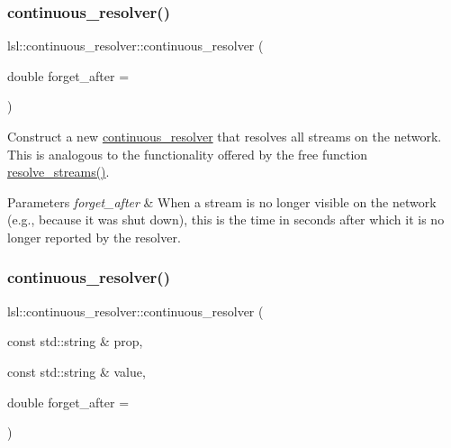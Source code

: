 \subsubsection{\texorpdfstring{continuous\+\_\+resolver()}{continuous\_resolver()}\hspace{0.1cm}{\footnotesize\ttfamily [1/3]}}
{\footnotesize\ttfamily lsl\+::continuous\+\_\+resolver\+::continuous\+\_\+resolver (\begin{DoxyParamCaption}\item[{double}]{forget\+\_\+after = {} }\end{DoxyParamCaption})\hspace{0.3cm}{\ttfamily [inline]}}

Construct a new \hyperlink{classlsl_1_1continuous__resolver}{continuous\+\_\+resolver} that resolves all streams on the network. This is analogous to the functionality offered by the free function \hyperlink{namespacelsl_a2935ff3db04cd640f69943ad14a61915}{resolve\+\_\+streams()}. 
\begin{DoxyParams}{Parameters}
{\em forget\+\_\+after} & When a stream is no longer visible on the network (e.\+g., because it was shut down), this is the time in seconds after which it is no longer reported by the resolver. \\
\hline
\end{DoxyParams}
\mbox{\label{classlsl_1_1continuous__resolver_a9eb3d09ca9c4f9c493a6978d403a5144}} 
\subsubsection{\texorpdfstring{continuous\+\_\+resolver()}{continuous\_resolver()}\hspace{0.1cm}{\footnotesize\ttfamily [2/3]}}
{\footnotesize\ttfamily lsl\+::continuous\+\_\+resolver\+::continuous\+\_\+resolver (\begin{DoxyParamCaption}\item[{const std\+::string \&}]{prop,  }\item[{const std\+::string \&}]{value,  }\item[{double}]{forget\+\_\+after = {} }\end{DoxyParamCaption})\hspace{0.3cm}{\ttfamily [inline]}}

